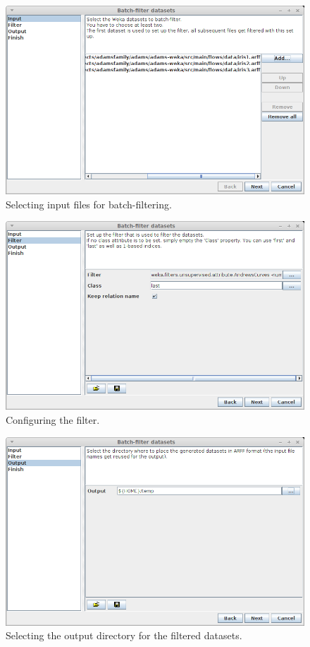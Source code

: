 \begin{figure}[htb]
  \centering
  \includegraphics[width=12.0cm]{images/batchfilter_datasets1.png}
  \caption{Selecting input files for batch-filtering.}
  \label{batchfilter_datasets1}
\end{figure}

\begin{figure}[htb]
  \centering
  \includegraphics[width=12.0cm]{images/batchfilter_datasets2.png}
  \caption{Configuring the filter.}
  \label{batchfilter_datasets2}
\end{figure}

\begin{figure}[htb]
  \centering
  \includegraphics[width=12.0cm]{images/batchfilter_datasets3.png}
  \caption{Selecting the output directory for the filtered datasets.}
  \label{batchfilter_datasets3}
\end{figure}

